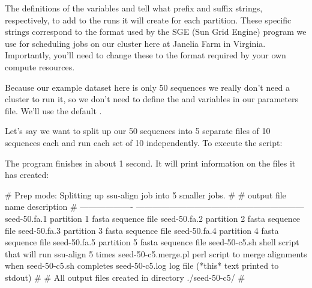 The definitions of the variables  and
 tell  what prefix and suffix
strings, respectively, to add to the  runs it will
create for each partition. These specific strings correspond to the
format used by the SGE (Sun Grid Engine)  program we use
for scheduling jobs on our cluster here at Janelia Farm in Virginia.
Importantly, you'll need to change these to the format required by
your own compute resources.

Because our example dataset here is only 50 sequences we really don't
need a cluster to run it, so we don't need to define the
 and  variables in our
parameters file. We'll use the default .

Let's say we want to split up our 50 sequences into 5 separate files
of 10 sequences each and run each set of 10 independently. 
To execute the script:


The program finishes in about 1 second. It will print information on
the files it has created:

\newpage

\begin{comment}
# ssu-align :: define and align SSU rRNA sequences
# SSU-ALIGN 0.1 (June 2009)
# Copyright (C) 2009 HHMI Janelia Farm Research Campus
# Freely distributed under the GNU General Public License (GPLv3)
# - - - - - - - - - - - - - - - - - - - - - - - - - - - - - - - - - - - -
# command: /groups/eddy/home/nawrockie/ssualign/ssu-align -F -c 5 ../../seeds/ssu5-0p1.cm seed-50.fa seed-50-c5 ../../sa-0p1.params
# date:    Thu Jun 18 16:27:21 2009
#
\end{comment}
\begin{sreoutput}
# Prep mode: Splitting up ssu-align job into 5 smaller jobs.
#
# output file name     description                                                 
# -------------------  ------------------------------------------------------------
  seed-50.fa.1         partition 1 fasta sequence file
  seed-50.fa.2         partition 2 fasta sequence file
  seed-50.fa.3         partition 3 fasta sequence file
  seed-50.fa.4         partition 4 fasta sequence file
  seed-50.fa.5         partition 5 fasta sequence file
  seed-50-c5.sh        shell script that will run ssu-align 5 times
  seed-50-c5.merge.pl  perl script to merge alignments when seed-50-c5.sh completes
  seed-50-c5.log       log file (*this* text printed to stdout)
#
# All output files created in directory ./seed-50-c5/
#
\end{sreoutput}

